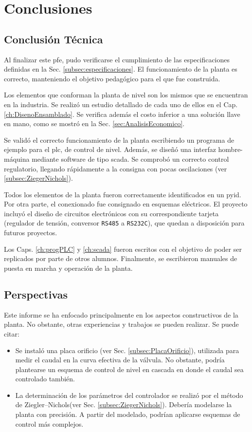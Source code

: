 \chapter{Conclusiones}
\label{ch:conclusiones}

\section{Conclusión Técnica}
\label{sec:ConclusionTecnica}

Al finalizar este \gls{pfe}, pudo verificarse el cumplimiento de las
especificaciones definidas en la Sec. \ref{subsec:especificaciones}.
El funcionamiento de la planta es correcto, manteniendo el objetivo pedagógico
para el que fue construida.

Los elementos que conforman la planta de nivel son los mismos que se
encuentran en la industria.
Se realizó un estudio detallado de cada uno de ellos en el Cap.
\ref{ch:DisenoEnsamblado}.
Se verifica además el costo inferior a una solución llave en mano, como se
mostró en la Sec. \ref{sec:AnalisisEconomico}.

Se validó el correcto funcionamiento de la planta escribiendo un programa de
ejemplo para el \gls{plc}, de control de nivel.
Además, se diseñó una interfaz hombre-máquina mediante software de tipo
\gls{scada}.
Se comprobó un correcto control regulatorio, llegando rápidamente a la consigna
con pocas oscilaciones (ver \ref{subsec:ZiegerNichols}).

Todos los elementos de la planta fueron correctamente identificados en un
\gls{pyid}.
Por otra parte, el conexionado fue consignado en esquemas eléctricos.
El proyecto incluyó el diseño de circuitos electrónicos con su correspondiente
tarjeta (regulador de tensión, conversor \verb|RS485| a \verb|RS232C|), que
quedan a disposición para futuros proyectos.

Los Caps. \ref{ch:progPLC} y \ref{ch:scada} fueron escritos con el
objetivo de poder ser replicados por parte de otros alumnos.
Finalmente, se escribieron manuales de puesta en marcha y operación de la
planta.

\section{Perspectivas}
\label{sec:Perspectivas}
Este informe se ha enfocado principalmente en los aspectos constructivos
de la planta.
No obstante, otras experiencias y trabajos se pueden realizar. Se puede citar:
\begin{itemize}
\item Se instaló una placa orificio (ver Sec. \ref{subsec:PlacaOrificio}), 
utilizada
para medir el caudal en la curva efectiva de la válvula.
No obstante, podría plantearse un esquema de control de nivel en cascada en
donde el caudal sea controlado también.
\item La determinación de los parámetros del controlador se realizó por 
el método de Ziegler–Nichols(ver Sec. \ref{subsec:ZiegerNichols}). Debería 
modelarse la planta con precisión. A partir del modelado, podrían aplicarse 
esquemas de control más complejos.
\end{itemize}

